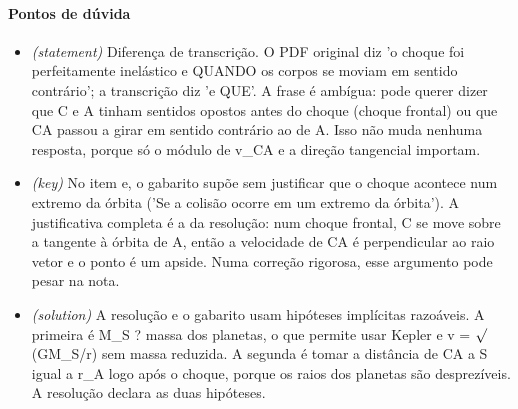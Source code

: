 \documentclass{article}%
\begin{document}
\paragraph{Pontos de dúvida}%
\begin{itemize}%
\item%
\textit{(statement)} Diferença de transcrição. O PDF original diz 'o choque foi perfeitamente inelástico e QUANDO os corpos se moviam em sentido contrário'; a transcrição diz 'e QUE'. A frase é ambígua: pode querer dizer que C e A tinham sentidos opostos antes do choque (choque frontal) ou que CA passou a girar em sentido contrário ao de A. Isso não muda nenhuma resposta, porque só o módulo de v\_CA e a direção tangencial importam.%
\item%
\textit{(key)} No item e, o gabarito supõe sem justificar que o choque acontece num extremo da órbita ('Se a colisão ocorre em um extremo da órbita'). A justificativa completa é a da resolução: num choque frontal, C se move sobre a tangente à órbita de A, então a velocidade de CA é perpendicular ao raio vetor e o ponto é um apside. Numa correção rigorosa, esse argumento pode pesar na nota.%
\item%
\textit{(solution)} A resolução e o gabarito usam hipóteses implícitas razoáveis. A primeira é M\_S ? massa dos planetas, o que permite usar Kepler e v = $\surd$(GM\_S/r) sem massa reduzida. A segunda é tomar a distância de CA a S igual a r\_A logo após o choque, porque os raios dos planetas são desprezíveis. A resolução declara as duas hipóteses.%
\end{itemize}%
\end{document}
